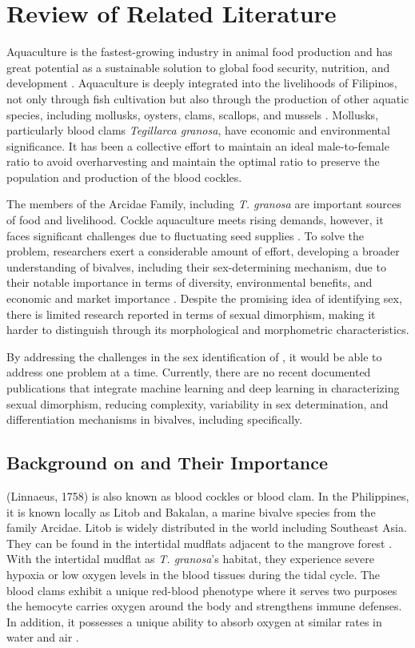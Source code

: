 \chapter{Review of Related Literature}
\label{sec:relatedlit}

Aquaculture is the fastest-growing industry in animal food production and has great potential as a sustainable solution to global food security, nutrition, and development \cite{fao2024}. Aquaculture is deeply integrated into the livelihoods of Filipinos, not only through fish cultivation but also through the production of other aquatic species, including mollusks, oysters, clams, scallops, and mussels \cite{breton2017sex}. Mollusks, particularly blood clams \textit{Tegillarca granosa}, have economic and environmental significance. It has been a collective effort to maintain an ideal male-to-female ratio to avoid overharvesting and maintain the optimal ratio to preserve the population and production of the blood cockles. 	

The members of the Arcidae Family, including \textit{T. granosa} are important sources of food and livelihood. Cockle aquaculture meets rising demands, however, it faces significant challenges due to fluctuating seed supplies \cite{miranda2023}. To solve the problem, researchers exert a considerable amount of effort, developing a broader understanding of bivalves, including their sex-determining mechanism, due to their notable importance in terms of diversity, environmental benefits, and economic and market importance \cite{breton2017sex}. Despite the promising idea of identifying sex, there is limited research reported in terms of sexual dimorphism, making it harder to distinguish through its morphological and morphometric characteristics. 

By addressing the challenges in the sex identification of \Tgranosa, it would be able to address one problem at a time. Currently, there are no recent documented publications that integrate machine learning and deep learning in characterizing sexual dimorphism, reducing complexity, variability in sex determination, and differentiation mechanisms in bivalves, including \Tgranosa specifically.

\section{Background on \Tgranosa and Their Importance}
\textit{\Tegillarcagranosa}(Linnaeus, 1758) is also known as blood cockles or blood clam. In the Philippines, it is known locally as Litob and Bakalan, a marine bivalve species from the family Arcidae. Litob is widely distributed in the world including Southeast Asia. They can be found in the intertidal mudflats adjacent to the mangrove forest \cite{srisunont2020}. With the intertidal mudflat as \textit{T. granosa}'s habitat, they experience severe hypoxia or low oxygen levels in the blood tissues during the tidal cycle. The blood clams exhibit a unique red-blood phenotype where it serves two purposes the hemocyte carries oxygen around the body and strengthens immune defenses. In addition,  it possesses a unique ability to absorb oxygen at similar rates in water and air \cite{zhan2022}. 


